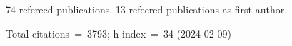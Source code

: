 74 refereed publications. 13 refeered publications as first author.

Total citations~=~3793; h-index~=~34 (2024-02-09)